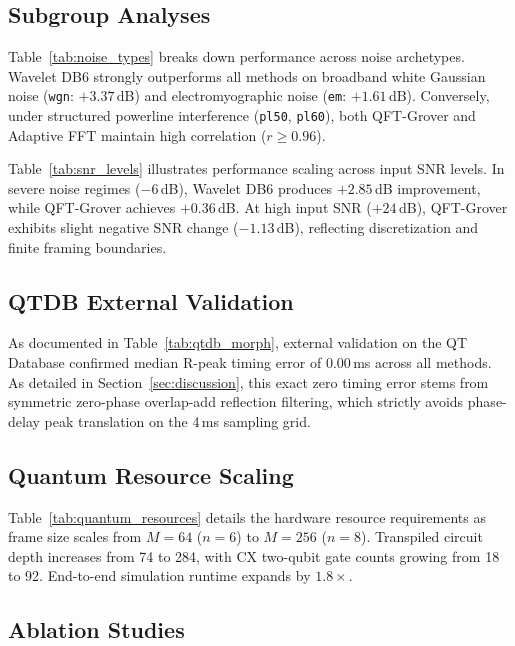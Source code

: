 \documentclass[journal,compsoc]{IEEEtran}
\begin{document}
\subsection{Subgroup Analyses}



Table~\ref{tab:noise_types} breaks down performance across noise archetypes. Wavelet DB6 strongly outperforms all methods on broadband white Gaussian noise (\texttt{wgn}: $+3.37$\,dB) and electromyographic noise (\texttt{em}: $+1.61$\,dB). Conversely, under structured powerline interference (\texttt{pl50}, \texttt{pl60}), both QFT-Grover and Adaptive FFT maintain high correlation ($r \ge 0.96$).

Table~\ref{tab:snr_levels} illustrates performance scaling across input SNR levels. In severe noise regimes ($-6$\,dB), Wavelet DB6 produces $+2.85$\,dB improvement, while QFT-Grover achieves $+0.36$\,dB. At high input SNR ($+24$\,dB), QFT-Grover exhibits slight negative SNR change ($-1.13$\,dB), reflecting discretization and finite framing boundaries.

\subsection{QTDB External Validation}

As documented in Table~\ref{tab:qtdb_morph}, external validation on the QT Database confirmed median R-peak timing error of $0.00$\,ms across all methods. As detailed in Section~\ref{sec:discussion}, this exact zero timing error stems from symmetric zero-phase overlap-add reflection filtering, which strictly avoids phase-delay peak translation on the 4\,ms sampling grid.

\subsection{Quantum Resource Scaling}

Table~\ref{tab:quantum_resources} details the hardware resource requirements as frame size scales from $M=64$ ($n=6$) to $M=256$ ($n=8$). Transpiled circuit depth increases from 74 to 284, with CX two-qubit gate counts growing from 18 to 92. End-to-end simulation runtime expands by $1.8\times$.

\subsection{Ablation Studies}



\end{document}
